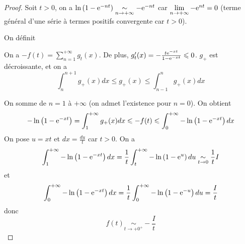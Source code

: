 \documentclass[12pt]{article}
\begin{document}
\begin{proof}
    Soit $t>0$, on a $\ln\left(1-\mathrm{e}^{-nt}\right)\underset{n\to+\infty}{\sim}-\mathrm{e}^{-nt}$ car $\lim\limits_{n\to+\infty}-\mathrm{e}^{nt}=0$ (terme général d'une série à termes positifs convergente car $t>0$).

    On définit 

    On a $-f(t)=\sum_{n=1}^{+\infty}g_{t}(x)$. De plus, $g_{t}'(x)=-\frac{t\mathrm{e}^{-xt}}{1-\mathrm{e}^{-xt}}\leqslant0$. $g_{+}$ est décroissante, et on a 
    \begin{equation}
        \int_{n}^{n+1}g_{+}(x)dx\leqslant g_{+}(x)\leqslant\int_{n-1}^{n}g_{+}(x)dx
    \end{equation}

    On somme de $n=1$ à $+\infty$ (on admet l'existence pour $n=0$). On obtient
    \begin{equation}
        -\ln\left(1-\mathrm{e}^{-xt}\right)=\int_{1}^{+\infty}g_{+}(x)dx\leqslant -f(t)\leqslant\int_{0}^{+\infty}-\ln\left(1-\mathrm{e}^{-xt}\right)dx
    \end{equation}
    On pose $u=xt$ et $dx=\frac{du}{t}$ car $t>0$. On a 
    \begin{equation}
        \int_{1}^{+\infty}-\ln\left(1-\mathrm{e}^{-xt}\right)dx=\frac{1}{t}\int_{t}^{+\infty}-\ln\left(1-\mathrm{e}^{u}\right)du\underset{t\to0}{\sim}\frac{1}{t}I
    \end{equation}
    et 
    \begin{equation}
        \int_{0}^{+\infty}-\ln\left(1-\mathrm{e}^{-xt}\right)dx=\frac{1}{t}\int_{0}^{+\infty}-\ln\left(1-\mathrm{e}^{-u}\right)du=\frac{I}{t}
    \end{equation}
    donc 
    \begin{equation}
        \boxed{
            f(t)\underset{t\to+0^{+}}{\sim}-\frac{I}{t}
        }
    \end{equation}
\end{proof}
\end{document}
